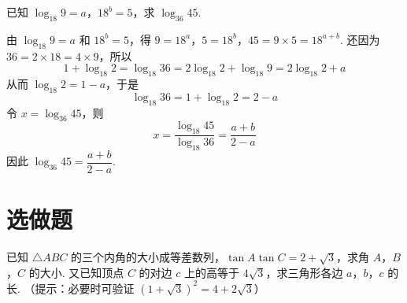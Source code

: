 \begin{problem}
已知 \(\log_{18}9=a\)，\(18^{b}=5\)，求 \(\log_{36}45\).
\end{problem}

\begin{solution}
由 \(\log_{18}9=a\) 和 \(18^{b}=5\)，得
\(9=18^{a}\)，\(5=18^{b}\)，\(45=9\times5=18^{a+b}\).
还因为 \(36=2\times18=4\times9\)，所以
\[
1+\log_{18}2=\log_{18}36=2\log_{18}2+\log_{18}9=2\log_{18}2+a
\]
从而 \(\log_{18}2=1-a\)，于是
\[
\log_{18}36=1+\log_{18}2=2-a
\]
令 \(x=\log_{36}45\)，则
\[
x=\frac{\log_{18}45}{\log_{18}36}=\frac{a+b}{2-a}
\]
因此 \(\log_{36}45=\dfrac{a+b}{2-a}\).
\end{solution}

\section{选做题}

\begin{problem}
已知 \(\triangle ABC\) 的三个内角的大小成等差数列，\(\tan A\tan C=2+\sqrt{3}\)，求角 \(A\)，\(B\)，\(C\) 的大小. 又已知顶点 \(C\) 的对边 \(c\) 上的高等于 \(4\sqrt{3}\)，求三角形各边 \(a\)，\(b\)，\(c\) 的长. （提示：必要时可验证 \((1+\sqrt{3})^{2}=4+2\sqrt{3}\)）
\end{problem}


